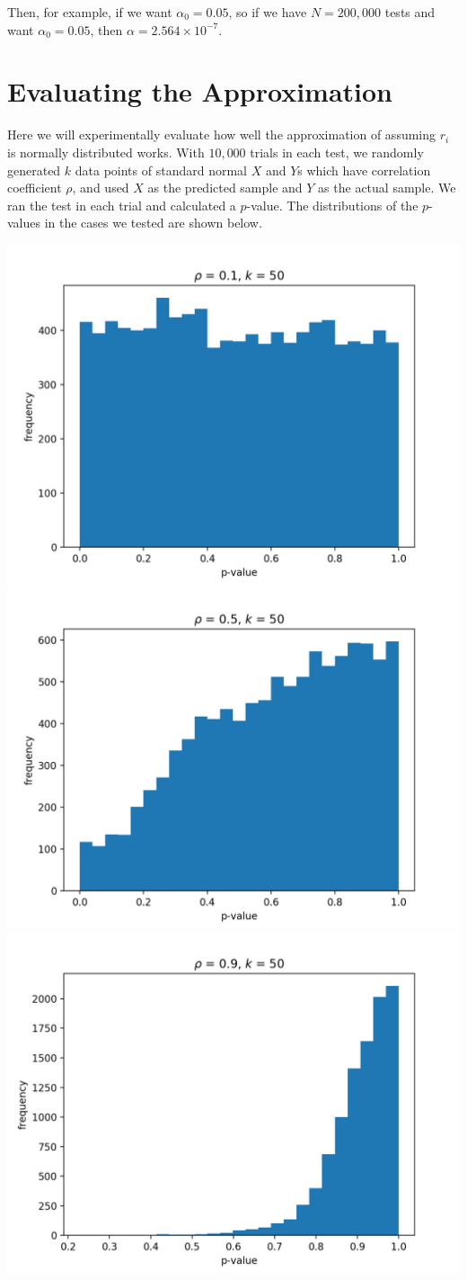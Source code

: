 \documentclass{article}
\begin{document}
Then, for example, if we want $\alpha_0 = 0.05$, so if we have $N = 200,000$ tests and want $\alpha_0 = 0.05$, then $\alpha = 2.564 \times 10^{-7}$.
\clearpage
\section{Evaluating the Approximation}

Here we will experimentally evaluate how well the approximation of assuming $r_i$ is normally distributed works. With $10,000$ trials in each test, we randomly generated $k$ data points of standard normal $X$ and $Y$s which have correlation coefficient $\rho$, and used $X$ as the predicted sample and $Y$ as the actual sample. We ran the test in each trial and calculated a $p$-value. The distributions of the $p$-values in the cases we tested are shown below.

\includegraphics[width=0.33\linewidth]{rho01k50.png}
\includegraphics[width=0.33\linewidth]{rho05k50.png}
\includegraphics[width=0.33\linewidth]{rho09k50.png}
\end{document}
